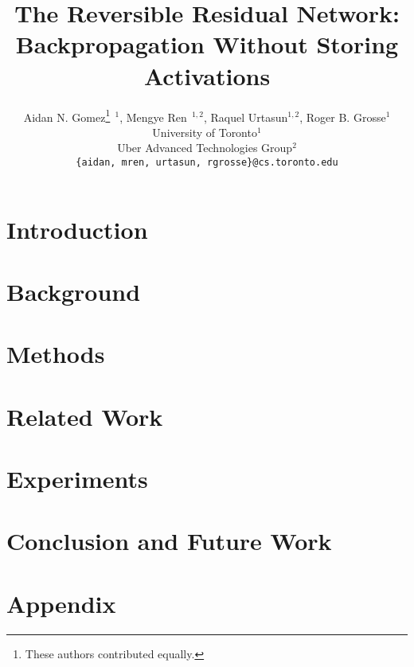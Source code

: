\documentclass{article}
\title{The Reversible Residual Network:\\Backpropagation Without Storing Activations}
\author{
Aidan N. Gomez\thanks{These authors contributed equally.}${\ \ }^1$,
Mengye Ren\samethanks[1]${\ \ }^{1,2}$,
Raquel Urtasun${}^{1, 2}$,
Roger B. Grosse${}^1$\\
University of Toronto${}^1$\\
Uber Advanced Technologies Group${}^2$\\
\texttt{\{aidan, mren, urtasun, rgrosse\}@cs.toronto.edu}
}
\begin{document}
\maketitle


\section{Introduction}


\section{Background}


\section{Methods}


\section{Related Work}


\section{Experiments}


\section{Conclusion and Future Work}





\newpage
\section{Appendix}

\end{document}
